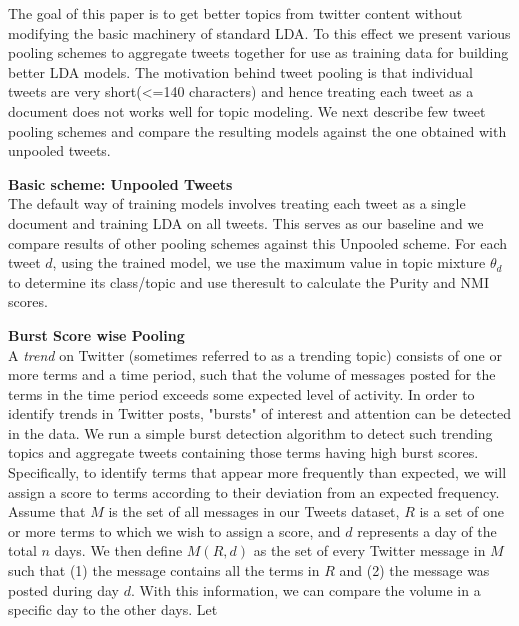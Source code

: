 \documentclass[10pt,a5paper,twoside]{article}
\begin{document}
The goal of this paper is to get better topics from twitter content without modifying the basic machinery of standard LDA. To this effect we present various pooling schemes to aggregate tweets together for use as training data for building better LDA models. The motivation behind tweet pooling is that individual tweets are very short(<=140 characters) and hence treating each tweet as a document does not works well for topic modeling. We next describe few tweet pooling schemes and compare the resulting models against the one obtained with unpooled tweets.


\begin{compactenum}

\item \textbf{Basic scheme: Unpooled Tweets}
\\
The default way of training models involves treating each tweet as a single document and training LDA on all tweets. This serves as our baseline and we compare results of other pooling schemes against this Unpooled scheme. For each tweet $d$, using the trained model, we use the maximum value in topic mixture $\theta_{d} $ to determine its class/topic and use theresult to calculate the Purity and NMI scores.
\\

\item \textbf{ Burst Score wise Pooling}
\\
A \textit{trend} on Twitter (sometimes referred to as a trending topic) consists of one or more terms and a time period, such that the volume of messages posted for the terms in the time period exceeds some expected level of activity. In order to identify trends in Twitter posts, "bursts" of interest and attention can be detected in the data. We run a simple burst detection algorithm to detect such trending topics and aggregate tweets containing those terms having high burst scores.
\\
Specifically, to identify terms that appear more frequently than expected, we will assign a score to terms according to their deviation from an expected frequency. Assume that $M$ is the set of all messages in our Tweets dataset, $R$ is a set of one or more terms to which we wish to assign a score, and $d$ represents a day of the total $n$ days. We then define $M(R, d)$ as the set of every Twitter message in $M$ such that (1) the message contains all the terms in $R$ and (2) the message was posted during day $d$. With this information, we can compare the volume in a specific day to the other days. Let 


\end{compactenum}
\end{document}
